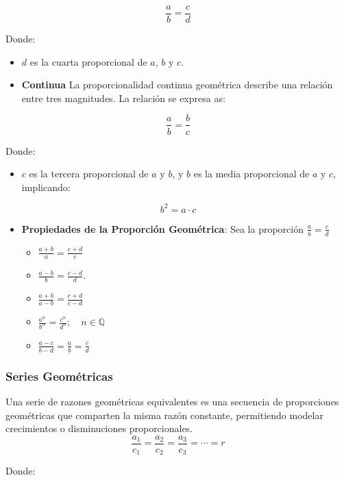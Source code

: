 \documentclass[
  stu,
  floatsintext,
  longtable,
  a4paper,
  nolmodern,
  notxfonts,
  notimes,
  colorlinks=true,linkcolor=blue,citecolor=blue,urlcolor=blue]{apa7}
\providecommand{\tightlist}{%
  \setlength{\itemsep}{0pt}\setlength{\parskip}{0pt}}
\begin{document}
\[
\frac{a}{b} = \frac{c}{d}
\]

Donde:

\begin{itemize}
\item
  \(d\) es la cuarta proporcional de \(a\), \(b\) y \(c\).
\item
  \textbf{Continua} La proporcionalidad continua geométrica describe una
  relación entre tres magnitudes. La relación se expresa as:
\end{itemize}

\[
\frac{a}{b} = \frac{b}{c}
\]

Donde:

\begin{itemize}
\tightlist
\item
  \(c\) es la tercera proporcional de \(a\) y \(b\), y \(b\) es la media
  proporcional de \(a\) y \(c\), implicando:
\end{itemize}

\[
b^2 = a \cdot c
\]

\begin{itemize}
\item
  \textbf{Propiedades de la Proporción Geométrica}: Sea la proporción
  \(\frac{a}{b} = \frac{c}{d}\)

  \begin{itemize}
  \item
    \(\frac{a+b}{a} = \frac{c+d}{c}\)
  \item
    \(\frac{a-b}{b} = \frac{c-d}{d}.\)
  \item
    \(\frac{a+b}{a-b} = \frac{c+d}{c-d}\)
  \item
    \(\frac{a^n}{b^n} = \frac{c^n}{d^n} ; \quad n \in \mathbb{Q}\)
  \item
    \(\frac{a-c}{b-d} = \frac{a}{b} = \frac{c}{d}\)
  \end{itemize}
\end{itemize}

\subsubsection{Series Geométricas}\label{series-geomuxe9tricas}

Una serie de razones geométricas equivalentes es una secuencia de
proporciones geométricas que comparten la misma razón constante,
permitiendo modelar crecimientos o disminuciones proporcionales. \[
\frac{a_1}{c_1} = \frac{a_2}{c_2} = \frac{a_3}{c_3} = \cdots = r
\]

Donde:
\end{document}
